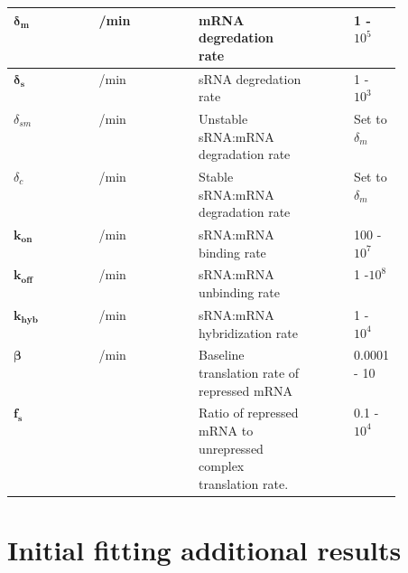 \documentclass[10pt,journal]{./IEEE_latex_class/IEEEtran}
\begin{document}
\begin{table}[h!]
\begin{tabular}{| l | l | p{0.3\linewidth} | p{0.1\linewidth} | p{0.1\linewidth} |}
\hline $\boldsymbol{\delta_{m}}$ &  /min & mRNA degredation rate & & 1 - $10^5$ \\
\hline $\boldsymbol{\delta_{s}}$ &  /min & sRNA degredation rate & & 1 - $10^3$ \\
\hline $\delta_{sm}$ &  /min & Unstable sRNA:mRNA degradation rate & &  Set to $\delta_m$\\
\hline $\delta_{c}$ &  /min & Stable sRNA:mRNA degradation rate & & Set to $\delta_m$ \\
\hline $\boldsymbol{k_{on}}$ &   /min & sRNA:mRNA binding rate & & 100 - $10^7$\\
\hline $\boldsymbol{k_{off}}$ &  /min & sRNA:mRNA unbinding rate & & 1 -$10^8$\\
\hline $\boldsymbol{k_{hyb}}$ &  /min & sRNA:mRNA hybridization rate & & 1 - $10^4$ \\
\hline $\boldsymbol{\beta}$ &   /min & Baseline translation rate of repressed mRNA & & 0.0001 - 10\\
\hline $\boldsymbol{f_{s}}$ & & Ratio of repressed mRNA to unrepressed complex translation rate. & & 0.1 - $10^4$\\
\hline
\end{tabular}
\end{table}

\clearpage

\section{Initial fitting additional results}
\label{Additional Initial Results figures}
\setcounter{figure}{0} 
\end{document}
